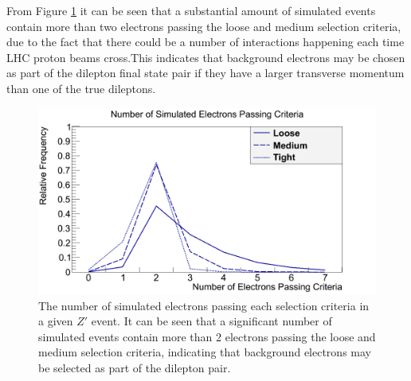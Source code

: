 \documentclass{article}
\begin{document}



From Figure \ref{fig:nEl} it can be seen that a substantial amount of simulated events contain more than two electrons passing the loose and medium selection criteria, due to the fact that there could be a number of interactions happening each time LHC proton beams cross.This indicates that background electrons may be chosen as part of the dilepton final state pair if they have a larger transverse momentum than one of the true dileptons.

\begin{figure}[h]
    \centering
    \includegraphics[scale=0.3]{images/nEl.png}
    \caption{The number of simulated electrons passing each selection criteria in a given $Z'$ event. It can be seen that a significant number of simulated events contain more than 2 electrons passing the loose and medium selection criteria, indicating that background electrons may be selected as part of the dilepton pair. \label{fig:nEl}}
\end{figure}
\end{document}

